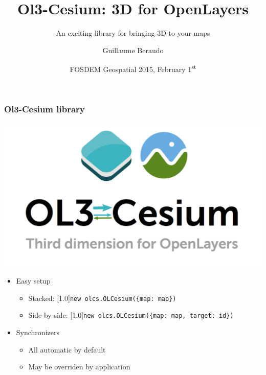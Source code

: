 \documentclass{beamer}
\title{Ol3-Cesium: 3D for OpenLayers}
\subtitle{An exciting library for bringing 3D to your maps}
\author{Guillaume Beraudo}
\institute{Opensource Engineer\\Camptocamp, Switzerland}
\date{FOSDEM Geospatial 2015, February 1\textsuperscript{st}}
\begin{document}
  \begin{frame}
    \titlepage
  \end{frame}


  \begin{frame}
    \frametitle{Ol3-Cesium library}

    \begin{center}
      \includegraphics[width=.4\linewidth]{./ol3-cesium-wide_arrows.png}
    \end{center}

    \begin{itemize}
     \item Easy setup
     \begin{itemize}
      \item Stacked: \small{\scalebox{.9}[1.0]{\texttt{new olcs.OLCesium(\{map: map\})}}}
      \item Side-by-side: \small{\scalebox{.9}[1.0]{\texttt{new olcs.OLCesium(\{map: map, target: id\})}}}
     \end{itemize}
      \pause
     \item Synchronizers 
      \begin{itemize}
      \item All automatic by default
      \item May be overriden by application
     \end{itemize}
    \end{itemize}
  \end{frame}
\end{document}
